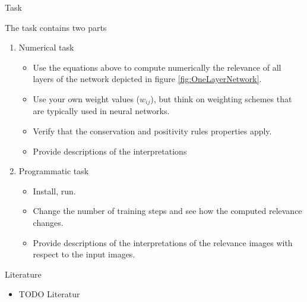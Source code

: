 \documentclass{beamer}
\begin{document}
\begin{frame}{Task}

The task contains two parts
\begin{enumerate}
\item Numerical task
	\begin{itemize}
		\item Use the equations above to compute numerically the relevance of all layers of the network depicted in figure \ref{fig:OneLayerNetwork}.
		\item Use your own weight values ($w_{ij}$), but think on weighting schemes that are typically used in neural networks.
		\item Verify that the conservation and positivity rules properties apply.
		\item Provide descriptions of the interpretations
	\end{itemize}
\item Programmatic task
	\begin{itemize}
		\item Install, run.
		\item Change the number of training steps and see how the computed relevance changes.
		\item Provide descriptions of the interpretations of the relevance images with respect to the input images.
	\end{itemize}
\end{enumerate}

\end{frame}

\begin{frame}{Literature}

\begin{itemize}
	\item TODO Literatur
\end{itemize}

\end{frame}
\end{document}

